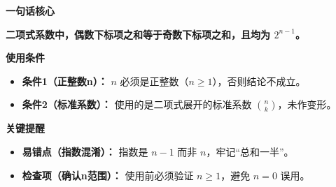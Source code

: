 \begin{summarybox}

	\textbf{\textcolor{CSummary}{一句话核心}}

	\textbf{二项式系数中，偶数下标项之和等于奇数下标项之和，且均为 $2^{n-1}$。}

	\medskip
	\textbf{\textcolor{CSummary}{使用条件}}
	\begin{itemize}[leftmargin=*, itemsep=0.5em, topsep=0.4em]
		\item \textbf{条件1（正整数n）：} $n$ 必须是正整数（$n\ge 1$），否则结论不成立。
		\item \textbf{条件2（标准系数）：} 使用的是二项式展开的标准系数 $\binom{n}{k}$，未作变形。
	\end{itemize}

	\medskip
	\textbf{\textcolor{CSummary}{关键提醒}}
	\begin{itemize}[leftmargin=*, itemsep=0.5em, topsep=0.4em]
		\item \textbf{易错点（指数混淆）：} 指数是 $n-1$ 而非 $n$，牢记“总和一半”。
		\item \textbf{检查项（确认n范围）：} 使用前必须验证 $n\ge 1$，避免 $n=0$ 误用。
	\end{itemize}

\end{summarybox}
